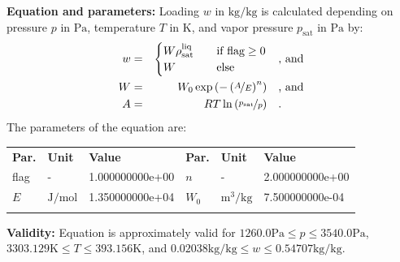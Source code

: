 \textbf{Equation and parameters:}
\newline
%
Loading $w$ in $\si{\kilogram\per\kilogram}$ is calculated depending on pressure $p$ in $\si{\pascal}$, temperature $T$ in $\si{\kelvin}$, and vapor pressure $p_\mathrm{sat}$ in $\si{\pascal}$ by:
%
\begin{equation*}
\begin{split}
w &=& \begin{cases} W \rho_\mathrm{sat}^{\mathrm{liq}} & \quad \text{if flag} \geq 0 \\ W & \quad \text{else} \end{cases} & \quad\text{, and} \\
W &=& W_0 \exp \left( - \left( \nicefrac{A}{E} \right) ^{n} \right) & \quad\text{, and} \\
A &=& R T \ln \left( \nicefrac{p_\mathrm{sat}}{p} \right) & \quad\text{.} \\
\end{split}
\end{equation*}
%
The parameters of the equation are:
%
\begin{longtable}[l]{lll|lll}
\toprule
\addlinespace
\textbf{Par.} & \textbf{Unit} & \textbf{Value} &	\textbf{Par.} & \textbf{Unit} & \textbf{Value} \\
\addlinespace
\midrule
\endhead

\bottomrule
\endfoot
\bottomrule
\endlastfoot
\addlinespace

flag & - & 1.000000000e+00 & $n$ & - & 2.000000000e+00 \\
$E$ & $\si{\joule\per\mole}$ & 1.350000000e+04 & $W_0$ & $\si{\cubic\meter\per\kilogram}$ & 7.500000000e-04 \\

\addlinespace\end{longtable}

\textbf{Validity:}
\newline
Equation is approximately valid for $1260.0 \si{\pascal} \leq p \leq 3540.0 \si{\pascal}$,  $3303.129 \si{\kelvin} \leq T \leq 393.156 \si{\kelvin}$, and $0.02038 \si{\kilogram\per\kilogram} \leq w \leq 0.54707 \si{\kilogram\per\kilogram}$.
\newline

